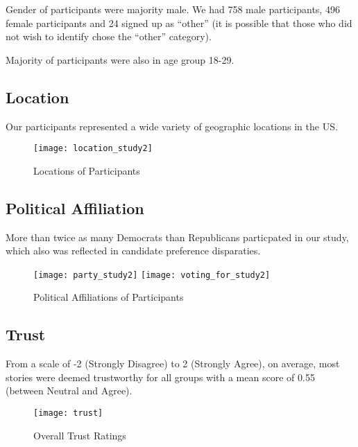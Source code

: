 Gender of participants were majority male. We had 758 male participants, 496 female participants and 24 signed up as ``other'' (it is possible that those who did not wish to identify chose the ``other'' category). 

Majority of participants were also in age group 18-29.
  

\subsection{Location}

Our participants represented a wide variety of geographic locations in the US.

\begin{figure}[H]  
\centering  
  \texttt{[image: location\_study2]} 
  \caption{Locations of Participants
    \label{fig:locations2}}
\end{figure}

\subsection{Political Affiliation}

More than twice as many Democrats than Republicans particpated in our study, which also was reflected in candidate preference disparaties. 

\begin{figure}[H]  
\centering 
  \texttt{[image: party\_study2]} 
  \texttt{[image: voting\_for\_study2]}  
  \caption{Political Affiliations of Participants
    \label{fig:political2}}
\end{figure}

 
  


\newpage
\subsection{Trust}
From a scale of -2 (Strongly Disagree) to 2 (Strongly Agree), on average, most stories were deemed trustworthy for all groups with a mean score of 0.55 (between Neutral and Agree). 

\begin{figure}[H]  
\centering 
  \texttt{[image: trust]}  
  \caption{Overall Trust Ratings
    \label{fig:trust}}
\end{figure}

